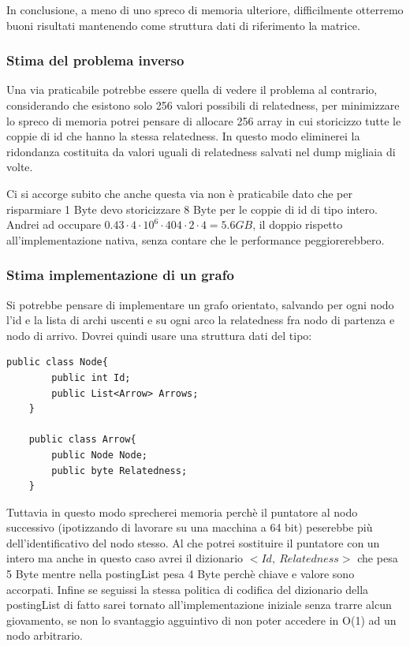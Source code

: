 In conclusione, a meno di uno spreco di memoria ulteriore, difficilmente otterremo buoni risultati mantenendo come struttura dati di riferimento la matrice. 

\subsubsection{Stima del problema inverso}
Una via praticabile potrebbe essere quella di vedere il problema al contrario, considerando che esistono solo 256 valori possibili di relatedness, 
per minimizzare lo spreco di memoria potrei pensare di allocare 256 array in cui storicizzo tutte le coppie di id che hanno la stessa relatedness. 
In questo modo eliminerei la ridondanza costituita da valori uguali di relatedness salvati nel dump migliaia di volte.

Ci si accorge subito che anche questa via non è praticabile dato che per risparmiare 1 Byte devo storicizzare 8 Byte per le coppie di id di tipo intero. 
Andrei ad occupare $0.43 \cdot 4 \cdot 10^6 \cdot 404 \cdot 2 \cdot 4 = 5.6 GB$, il doppio rispetto all'implementazione nativa, senza contare che 
le performance peggiorerebbero.

\subsubsection{Stima implementazione di un grafo}
Si potrebbe pensare di implementare un grafo orientato, salvando per ogni nodo l'id e la lista di archi uscenti e su ogni arco la relatedness fra nodo di partenza 
e nodo di arrivo. Dovrei quindi usare una struttura dati del tipo:
 
\begin{lstlisting}[style=JavaStyle]
    public class Node{
        public int Id;
        public List<Arrow> Arrows;  
    }

    public class Arrow{
        public Node Node;
        public byte Relatedness;
    }
\end{lstlisting}

Tuttavia in questo modo sprecherei memoria perchè il puntatore al nodo successivo (ipotizzando di lavorare su una macchina a 64 bit) peserebbe più dell'identificativo 
del nodo stesso. Al che potrei sostituire il puntatore con un intero ma anche in questo caso avrei il dizionario $< Id,\ Relatedness >$ che pesa 5 Byte mentre nella 
postingList pesa 4 Byte perchè chiave e valore sono accorpati. Infine se seguissi la stessa politica di codifica del dizionario della postingList 
di fatto sarei tornato all'implementazione iniziale senza trarre alcun giovamento, se non lo svantaggio agguintivo di non poter accedere in O(1) ad un nodo arbitrario. 

